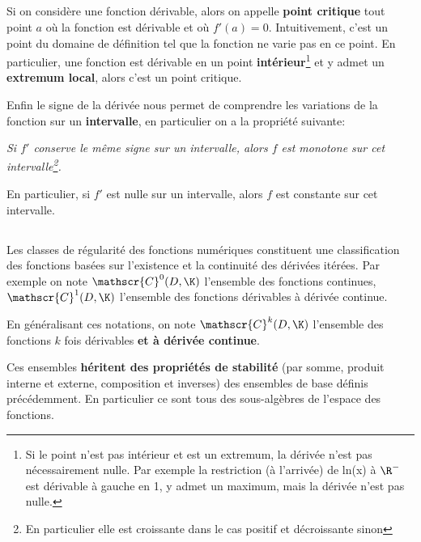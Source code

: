 \subsection*{}

Si on considère une fonction dérivable, alors on appelle \textbf{point critique} tout point \(a\) où la fonction est dérivable et où \(f'(a) = 0\). Intuitivement, c'est un point du domaine de définition tel que la fonction ne varie pas en ce point.\+
En particulier, une fonction est dérivable en un point \textbf{intérieur}\footnote[1]{Si le point n'est pas intérieur et est un extremum, la dérivée n'est pas nécessairement nulle. Par exemple la restriction (à l'arrivée) de ln(x) à \(\R^-\) est dérivable à gauche en 1, y admet un maximum, mais la dérivée n'est pas nulle.} et y admet un \textbf{extremum local}, alors c'est un point critique.\<

Enfin le signe de la dérivée nous permet de comprendre les variations de la fonction sur un \textbf{intervalle}, en particulier on a la propriété suivante:
\begin{center}
   \textit{Si \(f'\) conserve le même signe sur un intervalle, alors \(f\) est monotone sur cet intervalle\footnote[2]{En particulier elle est croissante dans le cas positif et décroissante sinon}.}
\end{center}
En particulier, si \(f'\) est nulle sur un intervalle, alors \(f\) est constante sur cet intervalle.
\pagebreak 

\subsection*{}

Les classes de régularité des fonctions numériques constituent une classification des fonctions basées sur l'existence et la continuité des dérivées itérées.
Par exemple on note \(\mathscr{C}^0(D, \K)\) l'ensemble des fonctions continues, \(\mathscr{C}^1(D, \K)\) l'ensemble des fonctions dérivables à dérivée continue.\<

En généralisant ces notations, on note \(\mathscr{C}^k(D, \K)\) l'ensemble des fonctions \(k\) fois dérivables \textbf{et à dérivée continue}.\<

Ces ensembles \textbf{héritent des propriétés de stabilité} (par somme, produit interne et externe, composition et inverses) des ensembles de base définis précédemment. En particulier ce sont tous des sous-algèbres de l'espace des fonctions.

